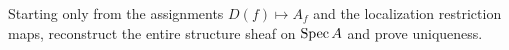 \begin{problem}\label{chal:vi18-c04}
Starting only from the assignments $D(f)\mapsto A_f$ and the localization restriction maps, reconstruct the entire structure sheaf on $\operatorname{Spec} A$ and prove uniqueness.
\end{problem}
